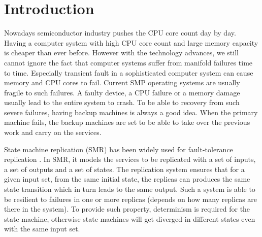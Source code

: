 \chapter{Introduction}




Nowadays semiconductor industry pushes the CPU core count day by day. Having a computer system with high CPU core count and large memory capacity is cheaper than ever before. However with the technology advances, we still cannot ignore the fact that computer systems suffer from manifold failures time to time. Especially transient fault in a sophisticated computer system can cause memory and CPU cores to fail. Current SMP operating systems are usually fragile to such failures. A faulty device, a CPU failure or a memory damage usually lead to the entire system to crash. To be able to recovery from such severe failures, having backup machines is always a good idea. When the primary machine fails, the backup machines are set to be able to take over the previous work and carry on the services.

State machine replication (SMR) has been widely used for fault-tolerance replication . In SMR, it models the services to be replicated with a set of inputs, a set of outputs and a set of states. The replication system ensures that for a given input set, from the same initial state, the replicas can produces the same state transition which in turn leads to the same output. Such a system is able to be resilient to failures in one or more replicas (depends on how many replicas are there in the system). To provide such property, determinism is required for the state machine, otherwise state machines will get diverged in different states even with the same input set.

